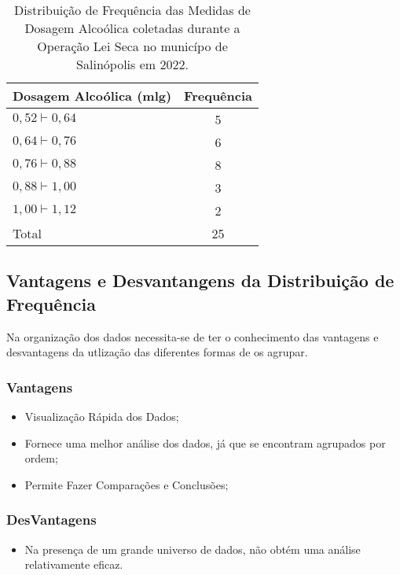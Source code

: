 \begin{table}[!htb]
    \centering
    {
    \caption{Distribuição de Frequência das Medidas de Dosagem Alcoólica coletadas durante a Operação Lei Seca no municípo de Salinópolis em 2022.}
    \label{toxalimentar}
    \vspace{-0.1cm}
\begin{tabular}{l|c}
  \hline\hline
  Dosagem Alcoólica (mlg) & Frequência \\
  \hline\hline
  $0,52 \vdash 0,64$ & 5 \\
  $0,64 \vdash 0,76$ & 6 \\
  $0,76 \vdash 0,88$ & 8 \\
  $0,88 \vdash 1,00$ & 3 \\
  $1,00 \vdash 1,12$ & 2 \\
  \hline\hline
  Total & 25 \\
    \hline\hline
\end{tabular}}
\end{table}


\newpage
\subsection{Vantagens e Desvantangens da Distribuição de Frequência}

Na organização dos dados necessita-se de ter o conhecimento das vantagens e desvantagens da utlização das diferentes formas de os agrupar.\vskip0.3cm

\subsubsection{Vantagens}

\begin{itemize}
    \item Visualização Rápida dos Dados;
    \item Fornece uma melhor análise dos dados, já que se encontram agrupados por ordem;
    \item Permite Fazer Comparações e Conclusões;
\end{itemize}

\subsubsection{DesVantagens}

\begin{itemize}
    \item Na presença de um grande universo de dados, não obtém uma análise relativamente eficaz.
\end{itemize}















